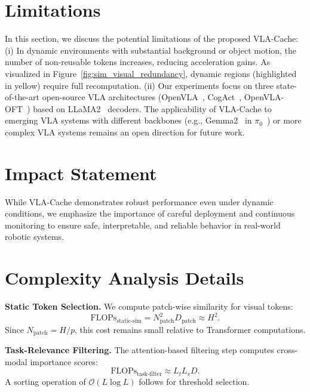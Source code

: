 
\clearpage
\section{Limitations}
\label{appendix:limits}
In this section, we discuss the potential limitations of the proposed VLA-Cache: 
(i) In dynamic environments with substantial background or object motion, the number of non-reusable tokens increases, reducing acceleration gains. As visualized in Figure~\ref{fig:sim_visual_redundancy}, dynamic regions (highlighted in yellow) require full recomputation. 
(ii) Our experiments focus on three state-of-the-art open-source VLA architectures (OpenVLA~\cite{kim24openvla}, CogAct~\cite{li2024cogact}, OpenVLA-OFT~\cite{kim2025fine}) based on LLaMA2~\cite{touvron2023llama} decoders. The applicability of VLA-Cache to emerging VLA systems with different backbones (e.g., Gemma2~\cite{team2024gemma} in $\pi_0$~\cite{black2024pi_0}) or more complex VLA systems remains an open direction for future work.

\section{Impact Statement}
\label{app:impact}
While VLA-Cache demonstrates robust performance even under dynamic conditions, we emphasize the importance of careful deployment and continuous monitoring to ensure safe, interpretable, and reliable behavior in real-world robotic systems.

\section{Complexity Analysis Details}
\label{appendix:complexity}

\noindent
\textbf{Static Token Selection.} 
We compute patch-wise similarity for visual tokens:
\begin{equation}
\label{eq:patch_sim_flops}
\text{FLOPs}_{\text{static-sim}} = N_{\mathrm{patch}}^2 D_{\mathrm{patch}} \approx H^2.
\end{equation}
Since $N_{\mathrm{patch}} = H/p$, this cost remains small relative to Transformer computations.

\noindent
\textbf{Task-Relevance Filtering.} 
The attention-based filtering step computes cross-modal importance scores:
\begin{equation}
\label{eq:task_relevance_flops}
\text{FLOPs}_{\text{task-filter}} \approx L_t L_v D.
\end{equation}
A sorting operation of $\mathcal{O}(L \log L)$ follows for threshold selection.

